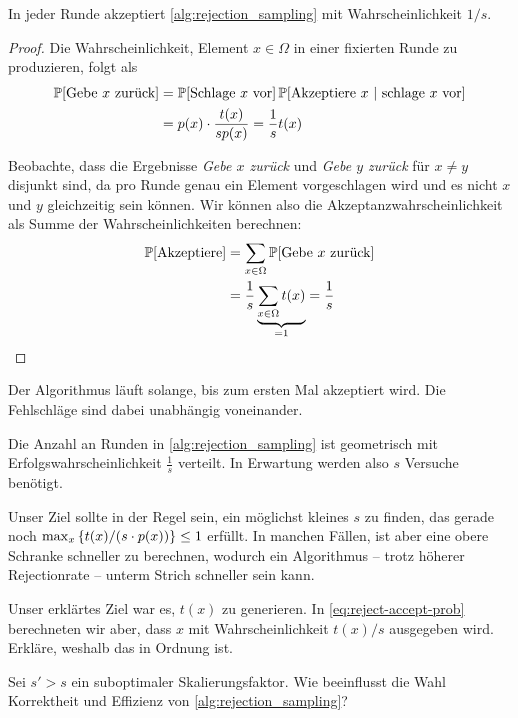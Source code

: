 \begin{lemma}
    In jeder Runde akzeptiert \cref{alg:rejection_sampling} mit Wahrscheinlichkeit $1 / s$.
\end{lemma}

\begin{proof}
    Die Wahrscheinlichkeit, Element $x \in \Omega$ in einer fixierten Runde zu produzieren, folgt als
    \begin{align}
        \mathbb{P}\!\left[\text{Gebe $x$ zurück}\right] & = \mathbb{P}\!\left[\text{Schlage $x$ vor}\right] \mathbb{P}\!\left[\text{Akzeptiere $x$} \ \middle|\ \text{schlage $x$ vor}\right] \\
                                      & = p(x) \cdot \frac{t(x)}{s p(x)} = \frac{1}{s} t(x) \label{eq:reject-accept-prob}
    \end{align}

    Beobachte, dass die Ergebnisse \emph{Gebe $x$ zurück} und \emph{Gebe $y$ zurück} für $x \ne y$ disjunkt sind, da pro Runde genau ein Element vorgeschlagen wird und es nicht $x$ und $y$ gleichzeitig sein können.
    Wir können also die Akzeptanzwahrscheinlichkeit als Summe der Wahrscheinlichkeiten berechnen:
    \begin{align}
        \mathbb{P}\!\left[\text{Akzeptiere}\right] & = \sum_{x \in \Omega} \mathbb{P}\!\left[\text{Gebe $x$ zurück}\right]                    \\
                                 & = \frac{1}{s} \underbrace{\sum_{x \in \Omega} t(x)}_{=1} = \frac{1}{s}
        \qedhere
    \end{align}
\end{proof}

Der Algorithmus läuft solange, bis zum ersten Mal akzeptiert wird.
Die Fehlschläge sind dabei unabhängig voneinander.

\begin{corollary}\label{cor:laufzeit-rejection-sampling}
    Die Anzahl an Runden in \cref{alg:rejection_sampling} ist geometrisch mit Erfolgswahrscheinlichkeit $\frac{1}{s}$ verteilt.
    In Erwartung werden also $s$ Versuche benötigt.
\end{corollary}

Unser Ziel sollte in der Regel sein, ein möglichst kleines $s$ zu finden, das gerade noch $\max_x \left\{t(x) / (s \cdot p(x))\right\} \le 1$ erfüllt.
In manchen Fällen, ist aber eine obere Schranke schneller zu berechnen, wodurch ein Algorithmus -- trotz höherer Rejectionrate -- unterm Strich schneller sein kann.

\begin{exercise}
    Unser erklärtes Ziel war es, $t(x)$ zu generieren.
    In \cref{eq:reject-accept-prob} berechneten wir aber, dass $x$ mit Wahrscheinlichkeit $t(x) / s$ ausgegeben wird.
    Erkläre, weshalb das in Ordnung ist.

    Sei $s' > s$ ein suboptimaler Skalierungsfaktor.
    Wie beeinflusst die Wahl Korrektheit und Effizienz von \cref{alg:rejection_sampling}?
\end{exercise}

